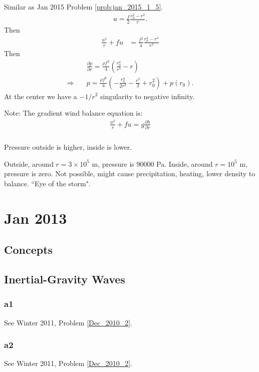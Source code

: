 \documentclass[11pt,letterpaper]{book}
\theoremstyle{definition}
\newcommand{\pe}{\partial}
\newcommand{\thus}{\Rightarrow \quad }
\begin{document}
\subsection{}
Similar as Jan 2015 Problem \ref{prob:jan_2015_1_5}.
\begin{align*}
u = \frac{f}{2}\frac{r_0^2-r^2}{r}.
\end{align*}
Then
\begin{align*}
    \frac{u^2}{r}+fu &= \frac{f^2}{4}\frac{r_0^4-r^4}{r^3}
\end{align*}
Then
\begin{align*}
    &\frac{\pe p}{\pe r} = \frac{\rho f^2}{4}\left(\frac{r_0^4}{r^3}-r\right)\\
    \thus & p = \frac{\rho f^2}{4}\left(-\frac{r_0^4}{2 r^2}-\frac{r^2}{2}+r_0^2\right)+p(r_0).
\end{align*}
At the center we have a $-1/r^2$ singularity to negative infinity.

Note: The gradient wind balance equation is:
\begin{align*}
    \frac{u^2}{r}+fu = g\frac{\pe h}{\pe r}
\end{align*}

\subsection{}
Pressure outside is higher, inside is lower. 

Outside, around $r = 3\times 10^5$ m, pressure is $90000$ Pa. Inside, around $r = 10^5$ m, pressure is zero. Not possible, might cause precipitation, heating, lower density to balance. ``Eye of the storm".

\chapter{Jan 2013}
\section{Concepts}

\section{Inertial-Gravity Waves}
\subsection{a1}
See Winter 2011, Problem \ref{Dec_2010_2}.

\subsection{a2}
See Winter 2011, Problem \ref{Dec_2010_2}.
\end{document}
